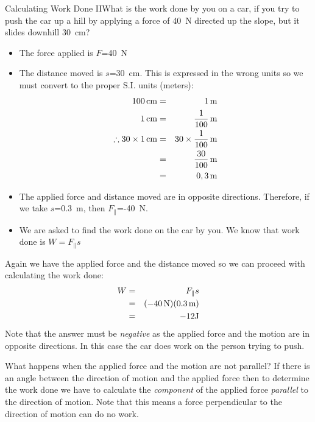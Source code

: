\begin{wex}{Calculating Work Done II}{What is the work done by you on a car, if you try to push the car up a hill by applying a force of 40~N directed up the slope, but it slides downhill 30~cm?}
{
\begin{itemize}
\item The force applied is $F$=40~N
\item The distance moved is $s$=30~cm. This is expressed in the wrong units
so we must convert to the proper S.I. units (meters):
\begin{eqnarray*}
100\,\rm{cm}&=&1\,\rm{m}\\
1\,\rm{cm}&=&\frac{1}{100}\,\rm{m}\\
\therefore 30 \times 1\,\rm{cm}&=&30 \times \frac{1}{100}\,\rm{m}\\
&=& \frac{30}{100}\,\rm{m}\\
&=& 0,3\,\rm{m}
\end{eqnarray*}
\item The applied force and distance moved are in opposite directions.  Therefore, if we take $s$=0.3~m, then $F_{\|}$=-40~N.
\end{itemize}
\begin{itemize}
\item We are asked to find the work done on the car by you. We know
that work done is $W=F_{\|}s$
\end{itemize}

Again we have the applied force and the distance moved so we can proceed with calculating the work done:
\begin{eqnarray*}
W&=&F_{\|} s\\
&=& (-40\,\rm{N})(0.3\,\rm{m})\\
&=& -12\rm{J}
\end{eqnarray*}
Note that the answer must be {\em negative} as the applied force and the motion are in opposite directions. In this case the car does work on the person trying to push.}
\end{wex}

What happens when the applied force and the motion are not parallel? If there is an angle between the direction of motion and the applied force then
to determine the work done we have to calculate the {\em component} of
the applied force {\em parallel} to the direction of motion. Note that this
means a force perpendicular to the direction of motion can do no work.

